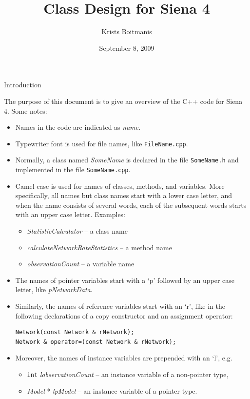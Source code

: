 \documentclass[12pt]{article}
\makeatletter
\renewcommand{\=}{\,=\,}
\newcommand{\+}{\,+\,}
\newcommand{\nnm}[1]{\textsf{\small\textit{#1}}}
\renewcommand{\section}{\@startsection{section}{1}
                {0pt}{\baselineskip}{0.5\baselineskip}
                {\centering\sffamily} }
\makeatother
\begin{document}
\title{Class Design for Siena 4}
\author{Krists Boitmanis}
\date{September 8, 2009}
\maketitle

\section{Introduction}

The purpose of this document is to give an overview of the C++ code for Siena 4.
Some notes:
\begin{itemize}
\item Names in the code are indicated as \nnm{name}.
\item Typewriter font is used for file names, like \texttt{FileName.cpp}.
\item Normally, a class named \nnm{SomeName} is declared in
the file \texttt{SomeName.h} and implemented in the file \texttt{SomeName.cpp}.
\item Camel case is used for names of classes, methods, and variables. More
specifically, all names but class names start with a lower case letter, and
when the name consists of several words, each of the subsequent words starts
with an upper case letter. Examples:
	\begin{itemize}
	\item \nnm{StatisticCalculator} -- a class name
	\item \nnm{calculateNetworkRateStatistics} -- a method name
	\item \nnm{observationCount} -- a variable name
	\end{itemize}
\item The names of pointer variables start with a `p' followed by an upper case
letter, like \nnm{pNetworkData}.
\item Similarly, the names of reference variables start with an `r', like in the
following declarations of a copy constructor and an assignment operator:
\begin{verbatim}
Network(const Network & rNetwork);
Network & operator=(const Network & rNetwork);
\end{verbatim}
\item Moreover, the names of instance variables are prepended with an `l', e.g.
	\begin{itemize}
	\item \verb|int| \nnm{lobservationCount} -- an instance variable of a
non-pointer type,
	\item \nnm{Model} * \nnm{lpModel} -- an instance variable of a pointer
type.
	\end{itemize}
\end{itemize}
\end{document}
